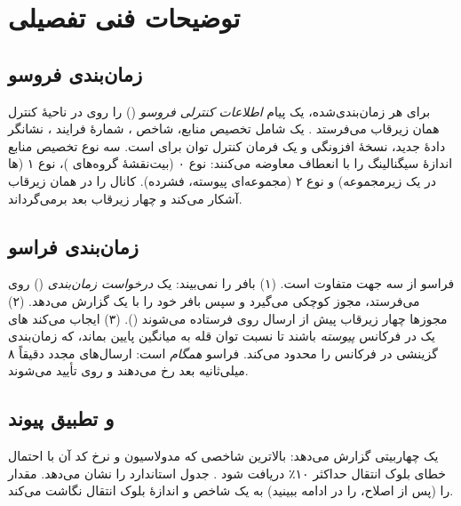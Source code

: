 \documentclass[11pt,a4paper]{article}
\begin{document}
\section{توضیحات فنی تفصیلی}

\subsection{زمان‌بندی فروسو}
برای هر  زمان‌بندی‌شده،  یک پیام \emph{اطلاعات کنترلی فروسو} () را روی 
در ناحیهٔ کنترل همان زیرقاب می‌فرستد \cite{ts36213}. یک  شامل تخصیص منابع، شاخص ، شمارهٔ
فرایند ، نشانگر دادهٔ جدید، نسخهٔ افزونگی و یک فرمان کنترل توان برای  است. سه نوع تخصیص
منابع اندازهٔ سیگنالینگ را با انعطاف معاوضه می‌کنند: نوع ۰ (بیت‌نقشهٔ گروه‌های )، نوع ۱ (ها در
یک زیرمجموعه) و نوع ۲ (مجموعه‌ای پیوسته، فشرده).  کانال  را در همان زیرقاب آشکار می‌کند و
چهار زیرقاب بعد  برمی‌گرداند.

\subsection{زمان‌بندی فراسو}
فراسو از سه جهت متفاوت است. (۱)  بافر  را نمی‌بیند:  یک \emph{درخواست زمان‌بندی}
() روی  می‌فرستد، مجوز کوچکی می‌گیرد و سپس بافر خود را با یک  گزارش می‌دهد.
(۲) مجوزها چهار زیرقاب پیش از ارسال  روی  فرستاده می‌شوند (). (۳) 
ایجاب می‌کند های یک  در فرکانس \emph{پیوسته} باشند تا نسبت توان قله به میانگین پایین بماند، که
زمان‌بندی گزینشی در فرکانس را محدود می‌کند.  فراسو \emph{همگام} است: ارسال‌های مجدد دقیقاً ۸ میلی‌ثانیه
بعد رخ می‌دهند و روی  تأیید می‌شوند.

\subsection{ و تطبیق پیوند}
 یک  چهاربیتی گزارش می‌دهد: بالاترین شاخصی که مدولاسیون و نرخ کد آن با احتمال خطای بلوک
انتقال حداکثر ۱۰٪ دریافت شود \cite{ts36213}.  جدول استاندارد را نشان می‌دهد.  مقدار
 را (پس از اصلاح،  را در ادامه ببینید) به یک شاخص  و اندازهٔ بلوک انتقال نگاشت می‌کند.
\end{document}
